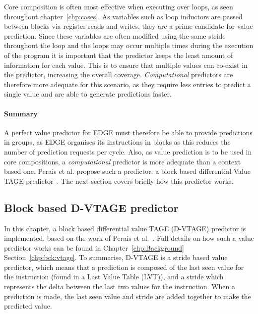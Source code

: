 Core composition is often most effective when executing over loops, as seen throughout chapter~\ref{chp:cases}.
As variables such as loop inductors are passed between blocks via register reads and writes, they are a prime candidate for value prediction.
Since these variables are often modified using the same stride throughout the loop and the loops may occur multiple times during the execution of the program it is important that the predictor keeps the least amount of information for each value.
This is to ensure that multiple values can co-exist in the predictor, increasing the overall coverage.
\textit{Computational} predictors are therefore more adequate for this scenario, as they require less entries to predict a single value and are able to generate predictions faster.


\paragraph*{Summary}

A perfect value predictor for EDGE must therefore be able to provide predictions in groups, as EDGE organises its instructions in blocks as this reduces the number of prediction requests per cycle.
Also, as value prediction is to be used in core compositions, a \textit{computational} predictor is more adequate than a context based one.
Perais et al. propose such a predictor: a block based differential Value TAGE predictor~\cite{peraisBeBop2015}.
The next section covers briefly how this predictor works.

\subsection{Block based D-VTAGE predictor}

In this chapter, a block based differential value TAGE (D-VTAGE) predictor is implemented, based on the work of Perais et al.~\cite{peraisBeBop2015}.
Full details on how such a value predictor works can be found in Chapter~\ref{chp:Background} Section~\ref{chp:bck:vtage}.
To summarise, D-VTAGE is a stride based value predictor, which means that a prediction is composed of the last seen value for the instruction (found in a Last Value Table (LVT)), and a stride which represents the delta between the last two values for the instruction.
When a prediction is made, the last seen value and stride are added together to make the predicted value.


